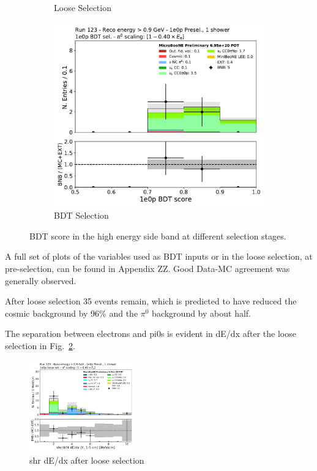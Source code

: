 \begin{figure}[H]
\begin{subfigure}{0.3\textwidth}
    \caption{Loose Selection}
    \end{subfigure}
    \begin{subfigure}{0.3\textwidth}
    \includegraphics[width=1.0\textwidth]{1e0p/High_E_Sideband/BDT_selection/bkg_score_high_bdt.pdf}
    \caption{BDT Selection}
    \end{subfigure}
    \caption{BDT score in the high energy side band at different selection stages.} 
    \label{fig:1e0p:High_E_sideband:bdtscore}
\end{figure}

A full set of plots of the variables used as BDT inputs or in the loose selection, at pre-selection, can be found in Appendix ZZ. Good Data-MC agreement was generally observed. 

After loose selection 35 events remain, which is predicted to have reduced the cosmic background by 96\% and the $\pi^{0}$ background by about half.  

The separation between electrons and pi0s is evident in dE/dx after the loose selection in Fig.~\ref{fig:1e0p:High_E_sideband:dedx}.

\begin{figure}[H]
    \centering
    \includegraphics[width=0.4\textwidth]{1e0p/High_E_Sideband/loose_selection/shr_tkfit_gap10_dedx_Y.pdf}
    \caption{shr dE/dx after loose selection}
    \label{fig:1e0p:High_E_sideband:dedx}
\end{figure}


